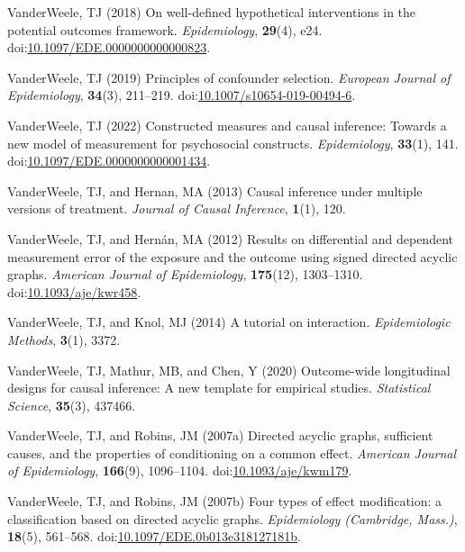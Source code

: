 \documentclass[
  singlecolumn]{article}
\newlength{\cslhangindent}
\newenvironment{CSLReferences}[2] %
 {\begin{list}{}{%
  \setlength{\itemindent}{0pt}
  \setlength{\leftmargin}{0pt}
  \setlength{\parsep}{0pt}
  \ifodd #1
   \setlength{\leftmargin}{\cslhangindent}
   \setlength{\itemindent}{-1\cslhangindent}
  \fi
  \setlength{\itemsep}{#2\baselineskip}}}
 {\end{list}}
\begin{document}
\begin{CSLReferences}{1}{0}
VanderWeele, TJ (2018) On well-defined hypothetical interventions in the
potential outcomes framework. \emph{Epidemiology}, \textbf{29}(4), e24.
doi:\href{https://doi.org/10.1097/EDE.0000000000000823}{10.1097/EDE.0000000000000823}.

VanderWeele, TJ (2019) Principles of confounder selection.
\emph{European Journal of Epidemiology}, \textbf{34}(3), 211--219.
doi:\href{https://doi.org/10.1007/s10654-019-00494-6}{10.1007/s10654-019-00494-6}.

VanderWeele, TJ (2022) Constructed measures and causal inference:
Towards a new model of measurement for psychosocial constructs.
\emph{Epidemiology}, \textbf{33}(1), 141.
doi:\href{https://doi.org/10.1097/EDE.0000000000001434}{10.1097/EDE.0000000000001434}.

VanderWeele, TJ, and Hernan, MA (2013) Causal inference under multiple
versions of treatment. \emph{Journal of Causal Inference},
\textbf{1}(1), 120.

VanderWeele, TJ, and Hernán, MA (2012) Results on differential and
dependent measurement error of the exposure and the outcome using signed
directed acyclic graphs. \emph{American Journal of Epidemiology},
\textbf{175}(12), 1303--1310.
doi:\href{https://doi.org/10.1093/aje/kwr458}{10.1093/aje/kwr458}.

VanderWeele, TJ, and Knol, MJ (2014) A tutorial on interaction.
\emph{Epidemiologic Methods}, \textbf{3}(1), 3372.

VanderWeele, TJ, Mathur, MB, and Chen, Y (2020) Outcome-wide
longitudinal designs for causal inference: A new template for empirical
studies. \emph{Statistical Science}, \textbf{35}(3), 437466.

VanderWeele, TJ, and Robins, JM (2007a) Directed acyclic graphs,
sufficient causes, and the properties of conditioning on a common
effect. \emph{American Journal of Epidemiology}, \textbf{166}(9),
1096--1104.
doi:\href{https://doi.org/10.1093/aje/kwm179}{10.1093/aje/kwm179}.

VanderWeele, TJ, and Robins, JM (2007b) Four types of effect
modification: a classification based on directed acyclic graphs.
\emph{Epidemiology (Cambridge, Mass.)}, \textbf{18}(5), 561--568.
doi:\href{https://doi.org/10.1097/EDE.0b013e318127181b}{10.1097/EDE.0b013e318127181b}.


\end{CSLReferences}
\end{document}
